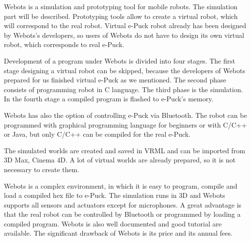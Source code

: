   Webots is a simulation and prototyping tool for mobile robots.
  The simulation part will be described.  Prototyping tools allow to create a virtual robot,
  which will correspond to the real robot.
  Virtual e-Puck robot already has been designed
  by Webots's developers, so users of Webots do not have to design its own virtual robot, 
  which corresponds to real e-Puck.
  
  Development of a program under Webots is divided into four stages. 
  The first stage designing a virtual robot can be skipped,
  because the developers of Webots prepared for us finished virtual e-Puck as we mentioned.
  The second phase consists of programming robot in C language. 
  The third phase is the simulation. In the fourth stage a compiled program is flashed to e-Puck's memory.
  
  Webots has also the option of controlling e-Puck via Bluetooth.
  The robot can be programmed with graphical programming language for beginners or with C/C++ or Java,
  but only C/C++ can be compiled for the real e-Puck.
  
  The simulated worlds are created and saved in VRML and can be imported 
  from 3D Max, Cinema 4D.
  A lot of virtual worlds are already prepared, so it is not necessary to create them.
  
  Webots is a complex environment, in which it is easy to program, compile and load 
  a compiled hex file to e-Puck.
  The simulation runs in 3D and Webots supports all sensors and actuators except for microphones.
  A great advantage is that the real robot can be controlled by Bluetooth or
  programmed by loading a compiled program.
  Webots is also well documented and good tutorial are available.
  The significant drawback of Webots is its price and its annual fees.
  
